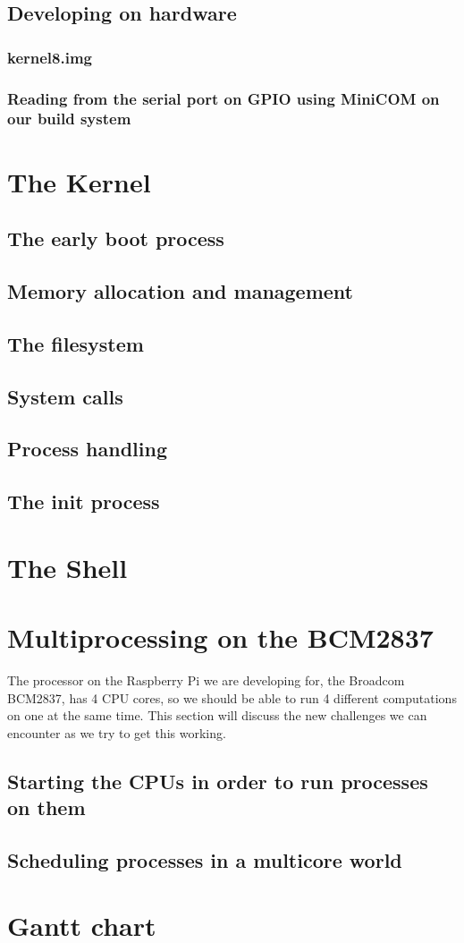 \documentclass{article}
\begin{document}
\subsection{Developing on hardware}
\subsubsection{kernel8.img}
\subsubsection{Reading from the serial port on GPIO using MiniCOM on our build
system}

\clearpage
\section{The Kernel}
\subsection{The early boot process}
\subsection{Memory allocation and management}
\subsection{The filesystem}
\subsection{System calls}
\subsection{Process handling}
\subsection{The init process}

\clearpage
\section{The Shell}

\clearpage
\section{Multiprocessing on the BCM2837}
The processor on the Raspberry Pi we are developing for, the Broadcom BCM2837,
has 4 CPU cores, so we should be able to run 4 different computations on one at
the same time. This section will discuss the new challenges we can encounter as
we try to get this working.
\subsection{Starting the CPUs in order to run processes on them}
\subsection{Scheduling processes in a multicore world}

\clearpage
\section{Gantt chart}



\printglossaries
\end{document}
